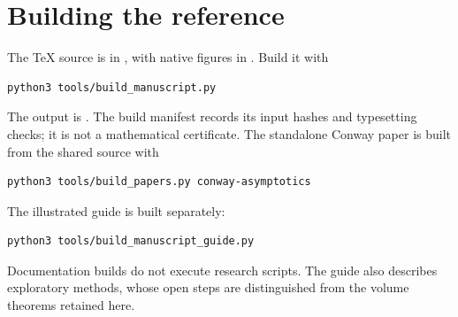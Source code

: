 \section{Building the reference}

The TeX source is in , with native figures
in . Build it with
\begin{verbatim}
python3 tools/build_manuscript.py
\end{verbatim}
The output is .
The build manifest records its input hashes and typesetting
checks; it is not a mathematical certificate. The standalone
Conway paper is built from the shared source with
\begin{verbatim}
python3 tools/build_papers.py conway-asymptotics
\end{verbatim}

The illustrated guide is built separately:
\begin{verbatim}
python3 tools/build_manuscript_guide.py
\end{verbatim}
Documentation builds do not execute research scripts. The guide
also describes exploratory methods, whose open steps are
distinguished from the volume theorems retained here.
